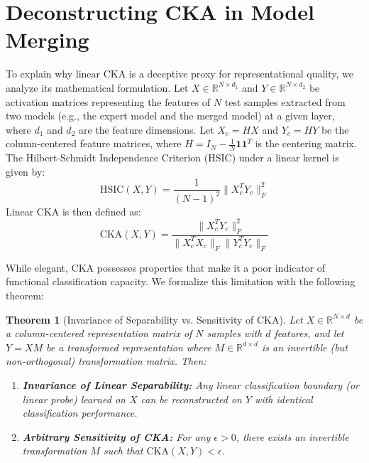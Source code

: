 \documentclass{article}
\theoremstyle{plain}
\newtheorem{theorem}{Theorem}[section]
\theoremstyle{definition}
\theoremstyle{remark}
\begin{document}
\vspace{-2mm}
\section{Deconstructing CKA in Model Merging}
\label{sec:deconstruction}

To explain why linear CKA is a deceptive proxy for representational quality, we analyze its mathematical formulation. Let $X \in \mathbb{R}^{N \times d_1}$ and $Y \in \mathbb{R}^{N \times d_2}$ be activation matrices representing the features of $N$ test samples extracted from two models (e.g., the expert model and the merged model) at a given layer, where $d_1$ and $d_2$ are the feature dimensions. Let $X_c = H X$ and $Y_c = H Y$ be the column-centered feature matrices, where $H = I_N - \frac{1}{N} \mathbf{1}\mathbf{1}^T$ is the centering matrix. The Hilbert-Schmidt Independence Criterion (HSIC) under a linear kernel is given by:
\begin{equation}
  \text{HSIC}(X, Y) = \frac{1}{(N-1)^2} \| X_c^T Y_c \|_F^2
\end{equation}
Linear CKA is then defined as:
\begin{equation}
  \text{CKA}(X, Y) = \frac{\| X_c^T Y_c \|_F^2}{\| X_c^T X_c \|_F \| Y_c^T Y_c \|_F}
\end{equation}

While elegant, CKA possesses properties that make it a poor indicator of functional classification capacity. We formalize this limitation with the following theorem:

\begin{theorem}[Invariance of Separability vs. Sensitivity of CKA]
\label{thm:cka_separability}
Let $X \in \mathbb{R}^{N \times d}$ be a column-centered representation matrix of $N$ samples with $d$ features, and let $Y = X M$ be a transformed representation where $M \in \mathbb{R}^{d \times d}$ is an invertible (but non-orthogonal) transformation matrix. 
Then:
\begin{enumerate}
    \item \textbf{Invariance of Linear Separability:} Any linear classification boundary (or linear probe) learned on $X$ can be reconstructed on $Y$ with identical classification performance.
    \item \textbf{Arbitrary Sensitivity of CKA:} For any $\epsilon > 0$, there exists an invertible transformation $M$ such that $\text{CKA}(X, Y) < \epsilon$.
\end{enumerate}
\end{theorem}
\end{document}
